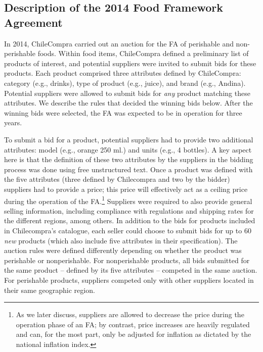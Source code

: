 \subsection{Description of the 2014 Food Framework Agreement}\label{sec:FA2014}


In 2014, ChileCompra carried out an auction for the FA of perishable and non-perishable foods. Within food items, ChileCompra defined a preliminary list of products of interest, and potential suppliers were invited to submit bids for these products. Each product comprised three attributes defined by ChileCompra: category (e.g., drinks), type of product (e.g., juice), and brand (e.g., Andina). Potential suppliers were allowed to submit bids for \emph{any} product matching these attributes. We describe the rules that decided the winning bids below. {After the winning bids were selected, the FA was expected to be in operation for three years.} 

To submit a bid for a product, potential suppliers had to provide two additional attributes: model (e.g., orange 250 ml.) and units (e.g., 4 bottles). A key aspect here is that the definition of these two attributes by the suppliers in the bidding process was done using free unstructured text.  Once a product was defined with the five attributes (three defined by Chilecompra and two by the bidder) suppliers had to provide a price; this price will effectively act as a ceiling price during the operation of the FA.\footnote{As we later discuss, suppliers are allowed to decrease the price during the operation phase of an FA; by contrast, price increases are heavily regulated and can, for the most part, only be adjusted for inflation as dictated by the national inflation index.} 
Suppliers were required to also provide general selling information, including compliance with regulations and shipping rates for the different regions, among others. In addition to the bids for products included in Chilecompra's catalogue, each seller could choose to submit bids for up to 60 \emph{new} products (which also include five attributes in their specification).  The auction rules were defined differently depending on whether the product was perishable or nonperishable. For nonperishable products, all bids submitted for the same product -- defined by its five attributes -- competed in the same auction. For perishable products, suppliers competed only with other suppliers located in their same geographic region.


